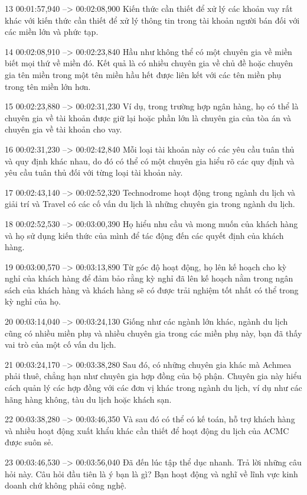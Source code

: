 13
00:01:57,940 --> 00:02:08,900
Kiến thức cần thiết để xử lý các khoản vay rất khác với kiến ​​thức cần thiết để xử lý thông tin trong tài khoản người bán đối với các miền lớn và phức tạp.

14
00:02:08,910 --> 00:02:23,840
Hầu như không thể có một chuyên gia về miền biết mọi thứ về miền đó.  Kết quả là có nhiều chuyên gia về chủ đề hoặc chuyên gia tên miền trong một tên miền hầu hết được liên kết với các tên miền phụ trong tên miền lớn hơn.

15
00:02:23,880 --> 00:02:31,230
Ví dụ, trong trường hợp ngân hàng, họ có thể là chuyên gia về tài khoản được giữ lại hoặc phần lớn là chuyên gia của tòa án và chuyên gia về tài khoản cho vay.

16
00:02:31,230 --> 00:02:42,840
Mỗi loại tài khoản này có các yêu cầu tuân thủ và quy định khác nhau, do đó có thể có một chuyên gia hiểu rõ các quy định và yêu cầu tuân thủ đối với từng loại tài khoản này.

17
00:02:43,140 --> 00:02:52,320
Technodrome hoạt động trong ngành du lịch và giải trí và Travel có các cố vấn du lịch là những chuyên gia trong ngành du lịch.

18
00:02:52,530 --> 00:03:00,390
Họ hiểu nhu cầu và mong muốn của khách hàng và họ sử dụng kiến ​​thức của mình để tác động đến các quyết định của khách hàng.

19
00:03:00,570 --> 00:03:13,890
Từ góc độ hoạt động, họ lên kế hoạch cho kỳ nghỉ của khách hàng để đảm bảo rằng kỳ nghỉ đã lên kế hoạch nằm trong ngân sách của khách hàng và khách hàng sẽ có được trải nghiệm tốt nhất có thể trong kỳ nghỉ của họ.

20
00:03:14,040 --> 00:03:24,130
Giống như các ngành lớn khác, ngành du lịch cũng có nhiều miền phụ và nhiều chuyên gia trong các miền phụ này, bạn đã thấy vai trò của một cố vấn du lịch.

21
00:03:24,170 --> 00:03:38,280
Sau đó, có những chuyên gia khác mà Achmea phải thuê, chẳng hạn như chuyên gia hợp đồng của bộ phận.  Chuyên gia này hiểu cách quản lý các hợp đồng với các đơn vị khác trong ngành du lịch, ví dụ như các hãng hàng không, tàu du lịch hoặc khách sạn.

22
00:03:38,280 --> 00:03:46,350
Và sau đó có thể có kế toán, hỗ trợ khách hàng và nhiều hoạt động xuất khẩu khác cần thiết để hoạt động du lịch của ACMC được suôn sẻ.

23
00:03:46,530 --> 00:03:56,040
Đã đến lúc tập thể dục nhanh.  Trả lời những câu hỏi này.  Câu hỏi đầu tiên là ý bạn là gì?  Bạn hoạt động và nghĩ về lĩnh vực kinh doanh chứ không phải công nghệ.

